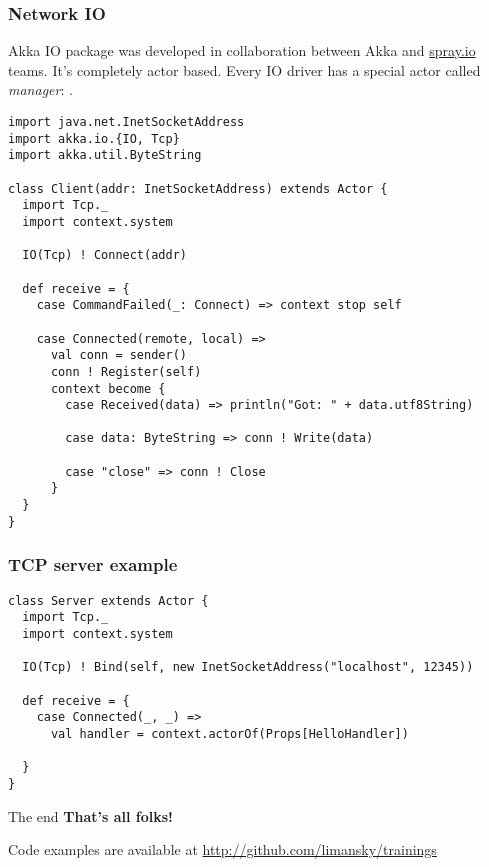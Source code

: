 \documentclass{beamer}
\begin{document}
\begin{frame}[fragile]
\frametitle{Network IO}
Akka IO package was developed in collaboration between Akka and \href{http://spray.io}{spray.io} teams. 
It's completely actor based. Every IO driver has a special actor called \emph{manager}:
.

\begin{example}
\begin{lstlisting}
import java.net.InetSocketAddress
import akka.io.{IO, Tcp}
import akka.util.ByteString

class Client(addr: InetSocketAddress) extends Actor {
  import Tcp._
  import context.system

  IO(Tcp) ! Connect(addr)

  def receive = {
    case CommandFailed(_: Connect) => context stop self

    case Connected(remote, local) =>
      val conn = sender()
      conn ! Register(self)
      context become {
        case Received(data) => println("Got: " + data.utf8String)

        case data: ByteString => conn ! Write(data)

        case "close" => conn ! Close
      }
  }
}
\end{lstlisting}
\end{example}
\end{frame}

\begin{frame}[fragile]
\frametitle{TCP server example}
\begin{lstlisting}
class Server extends Actor {
  import Tcp._
  import context.system

  IO(Tcp) ! Bind(self, new InetSocketAddress("localhost", 12345))

  def receive = {
    case Connected(_, _) =>
      val handler = context.actorOf(Props[HelloHandler])

  }
}

\end{lstlisting}
\end{frame}

\begin{frame}{The end}
\centering
\textbf{That's all folks!}

Code examples are available at \url{http://github.com/limansky/trainings}
\end{frame}
\end{document}
